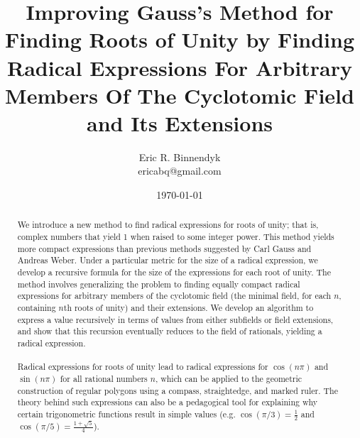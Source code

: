 \documentclass{article}
\title{Improving Gauss's Method for Finding Roots of Unity by Finding Radical Expressions For Arbitrary Members Of The Cyclotomic Field and Its Extensions}
\author{Eric R. Binnendyk \\ ericabq@gmail.com}
\date{\today}
\begin{document}
\maketitle

\begin{abstract}
    We introduce a new method to find radical expressions for roots of unity; that is, complex numbers that yield 1 when raised to some integer power. This method yields more compact expressions than previous methods suggested by Carl Gauss and Andreas Weber. Under a particular metric for the size of a radical expression, we develop a recursive formula for the size of the expressions for each root of unity. The method involves generalizing the problem to finding equally compact radical expressions for arbitrary members of the cyclotomic field (the minimal field, for each $ n $, containing $ n $th roots of unity) and their extensions. We develop an algorithm to express a value recursively in terms of values from either subfields or field extensions, and show that this recursion eventually reduces to the field of rationals, yielding a radical expression.\\
    \\
    Radical expressions for roots of unity lead to radical expressions for $ \cos(n\pi) $ and $ \sin(n\pi) $ for all rational numbers $ n $, which can be applied to the geometric construction of regular polygons using a compass, straightedge, and marked ruler. The theory behind such expressions can also be a pedagogical tool for explaining why certain trigonometric functions result in simple values (e.g. $ \cos(\pi/3) = \frac{1}{2} $ and $ \cos(\pi/5) = \frac{1 + \sqrt{5}}{4} $).\\
\end{abstract}
\end{document}
